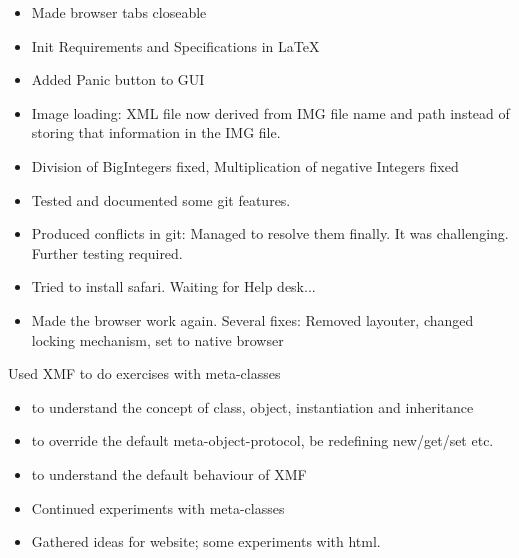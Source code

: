 \setcounter{section}{14}
\setcounter{subsection}{36}
\begin{itemize}
\item Made browser tabs closeable
\item Init Requirements and Specifications in LaTeX
\item Added Panic button to GUI
\item Image loading: XML file now derived from IMG file name and path instead of storing
that information in the IMG file.
\item Division of BigIntegers fixed, Multiplication of negative Integers fixed
\end{itemize}
\begin{itemize}
\item Tested and documented some git features.
\item Produced conflicts in git: Managed to resolve them finally. It was challenging. Further
testing required.
\item Tried to install safari. Waiting for Help desk...
\item Made the browser work again. Several fixes: Removed layouter, changed locking mechanism,
set to native browser
\end{itemize}
Used XMF to do exercises with meta-classes \begin{itemize} 
\item to understand the concept of class, object, instantiation and inheritance
\item to override the default meta-object-protocol, be redefining new/get/set etc.
\item to understand the default behaviour of XMF
\end{itemize}
\begin{itemize} 
\item Continued experiments with meta-classes
\item Gathered ideas for website; some experiments with html.
\end{itemize}
